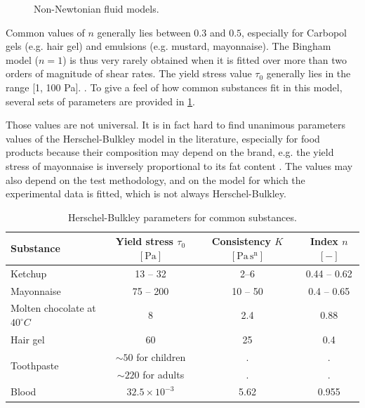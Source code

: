 \documentclass[11 pt]{report}
\begin{document}
\begin{figure}[t]
    \centering
    
    \caption{Non-Newtonian fluid models.}
    \label{fig:fluid-classification}
\end{figure}

Common values of $n$ generally lies between $0.3$ and $0.5$, especially for Carbopol gels (e.g. hair gel) and emulsions (e.g. mustard, mayonnaise). The Bingham model ($n = 1$) is thus very rarely obtained when it is fitted over more than two orders of magnitude of shear rates. The yield stress value $\tau_0$ generally lies in the range [1, 100 Pa]. \cite{Coussot}. To give a feel of how common substances fit in this model, several sets of parameters are provided in \cref{tab:parameters}.

Those values are not universal. It is in fact hard to find unanimous parameters values of the Herschel-Bulkley model in the literature, especially for food products because their composition may depend on the brand, e.g. the yield stress of mayonnaise is inversely proportional to its fat content \cite{mayonnaiseFat}. The values may also depend on the test methodology, and on the model for which the experimental data is fitted, which is not always Herschel-Bulkley.

\begin{table}[t]
    \centering
    \begin{tabular}[t]{lccc}
        \toprule
        Substance 
        & Yield stress $\tau_0$ $[\mathrm{Pa}]$ 
        & Consistency $K$ $[\mathrm{Pa \, s^n}]$ 
        & Index $n$ $[-]$\\
        \midrule
        Ketchup \cite{ketchup}       & 13 -- 32 & 2--6 & 0.44 -- 0.62 \\[2pt]
        Mayonnaise \cite{mayonnaise1,mayonnaise2} & 75 -- 200 & 10 -- 50 & 0.4 -- 0.65 \\[2pt]
        Molten chocolate at $40^\circ C$ \cite{chocolate} & 8 & 2.4 & 0.88 \\[2pt]
        Hair gel \cite{gel}                     & 60 & 25 & 0.4 \\[2pt]
        \multirow{2}{*}{Toothpaste\cite{toothpaste}}
                                     & $\sim 50$ for children & . & . \\
                                     & $\sim 220$ for adults & . & . \\[2pt]
        Blood \cite{Lee2011}         & $32.5\times 10^{-3}$ & 5.62 & 0.955 \\[2pt]
        \bottomrule
    \end{tabular}
    \caption{Herschel-Bulkley parameters for common substances.}
    \label{tab:parameters}
\end{table}%
\end{document}
